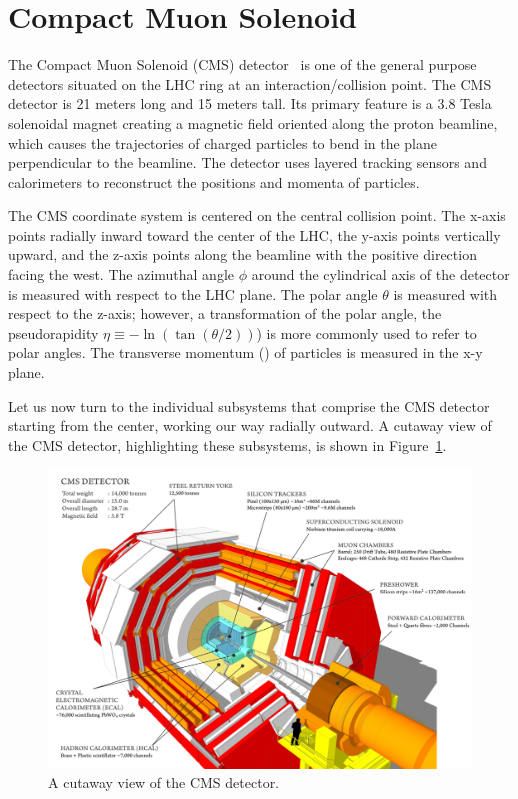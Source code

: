 \section{Compact Muon Solenoid}

The Compact Muon Solenoid (CMS)
detector~\cite{CMS:Chatrchyan2008zzk,CMS:PTDR2} is one of the general purpose
detectors situated on the LHC ring at an interaction/collision point. 
The CMS detector is 21 meters long and 15 meters tall. Its primary feature
is a 3.8 Tesla solenoidal magnet creating a magnetic field oriented along the proton 
beamline, which causes the trajectories of charged particles to bend in the plane
perpendicular to the beamline.
The detector uses layered tracking sensors and calorimeters to reconstruct the
positions and momenta of particles.

The CMS coordinate system is centered on the central collision point.
The x-axis points radially inward toward the center of the LHC,
the y-axis points vertically upward, and the z-axis points along the beamline
with the positive direction facing the west. The azimuthal angle $\phi$
around the cylindrical axis of the detector
is measured with respect to the LHC plane. The polar angle $\theta$
is measured with respect to the z-axis; however, a 
transformation of the polar angle, the pseudorapidity $\eta \equiv -\ln (\tan (\theta/2))$) 
is more commonly used
to refer to polar angles. The transverse momentum (\pt) of particles 
is measured in the x-y plane.

Let us now turn to the individual subsystems that comprise the CMS detector
starting from the center, working our way radially outward. A cutaway view of
the CMS detector, highlighting these subsystems, is shown in
Figure~\ref{fig:cmsdetector}.

\begin{figure}[!htbp]
    \centering
    \includegraphics[width=0.99\linewidth]{figs/misc/cms.png}
    \caption{
        A cutaway view of the CMS detector.
    }
    \label{fig:cmsdetector}
\end{figure}

